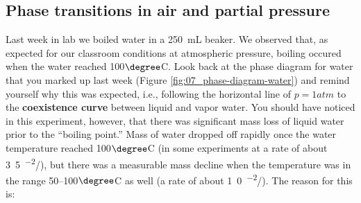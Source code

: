 \answerspace

\subsection{Phase transitions in air and partial pressure}

Last week in lab we boiled water in a 250~mL beaker.  We observed that, as expected for our classroom conditions at atmospheric pressure, boiling occured when the water reached 100$\degree$C.  Look back at the phase diagram for water that you marked up last week (Figure \ref{fig:07_phase-diagram-water}) and remind yourself why this was expected, i.e., following the horizontal line of $p = \unit{1}{atm}$ to the {\bf coexistence curve}  between liquid and vapor water.   You should have noticed in this experiment, however, that there was significant mass loss of liquid water prior to the ``boiling point.''  Mass of water dropped off rapidly once the water temperature reached 100$\degree$C (in some experiments at a rate of about \unit{3.5^{-2}}{\gram/\second}), but there was a measurable mass decline when the temperature was in the range 50--100$\degree$C  as well (a rate of about \unit{1.0^{-2}}{\gram/\second}). The reason for this is:
